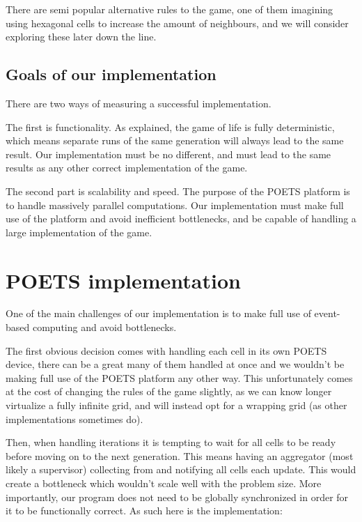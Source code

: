 \documentclass[a4paper]{article}
\begin{document}
There are semi popular alternative rules to the game, one of them imagining using hexagonal cells to increase the amount of neighbours, and we will consider exploring these later down the line. 

\subsection*{Goals of our implementation}
There are two ways of measuring a successful implementation.
\par The first is functionality. As explained, the game of life is fully deterministic, which means separate runs of the same generation will always lead to the same result. Our implementation must be no different, and must lead to the same results as any other correct implementation of the game.
\par The second part is scalability and speed. The purpose of the POETS platform is to handle massively parallel computations. Our implementation must make full use of the platform and avoid inefficient bottlenecks, and be capable of handling a large implementation of the game.

\section*{POETS implementation}
One of the main challenges of our implementation is to make full use of event-based computing and avoid bottlenecks. 
\par The first obvious decision comes with handling each cell in its own POETS device, there can be a great many of them handled at once and we wouldn't be making full use of the POETS platform any other way. This unfortunately comes at the cost of changing the rules of the game slightly, as we can know longer virtualize a fully infinite grid, and will instead opt for a wrapping grid (as other implementations sometimes do). 
\par Then, when handling iterations it is tempting to wait for all cells to be ready before moving on to the next generation. This means having an aggregator (most likely a supervisor) collecting from and notifying all cells each update. This would create a bottleneck which wouldn't scale well with the problem size. More importantly, our program does not need to be globally synchronized in order for it to be functionally correct. As such here is the implementation:
\end{document}
